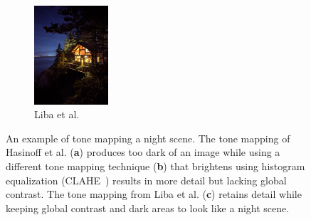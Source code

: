 \documentclass{sig-alternate}
\begin{document}
\begin{figure}
\begin{subfigure}{6.5pc}
\includegraphics[width=6.5pc]{figures/liba2019-figure-14c-95quality.jpg}
\caption{Liba et al.}
\label{fig:toneMapping:liba}
\end{subfigure}

\caption{An example of tone mapping a night scene. The tone mapping of Hasinoff et al. \cite{Hasinoff2016} (\textbf{a}) produces too dark of an image while using a different tone mapping technique (\textbf{b}) that brightens using histogram equalization (CLAHE~\cite{CLAHE}) results in more detail but lacking global contrast. The tone mapping from Liba et al. (\textbf{c}) retains detail while keeping global contrast and dark areas to look like a night scene.~\cite{Liba2019}}


\label{fig:toneMapping}
\end{figure}
\end{document}
